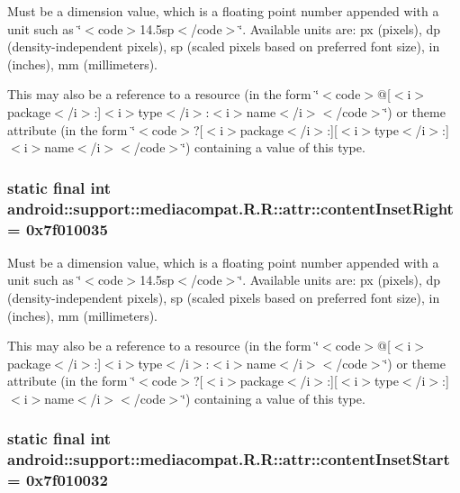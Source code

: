 Must be a dimension value, which is a floating point number appended with a unit such as \char`\"{}$<$code$>$14.5sp$<$/code$>$\char`\"{}. Available units are: px (pixels), dp (density-independent pixels), sp (scaled pixels based on preferred font size), in (inches), mm (millimeters). 

This may also be a reference to a resource (in the form \char`\"{}$<$code$>$@\mbox{[}$<$i$>$package$<$/i$>$:\mbox{]}$<$i$>$type$<$/i$>$:$<$i$>$name$<$/i$>$$<$/code$>$\char`\"{}) or theme attribute (in the form \char`\"{}$<$code$>$?\mbox{[}$<$i$>$package$<$/i$>$:\mbox{]}\mbox{[}$<$i$>$type$<$/i$>$:\mbox{]}$<$i$>$name$<$/i$>$$<$/code$>$\char`\"{}) containing a value of this type. \hypertarget{classandroid_1_1support_1_1mediacompat_1_1_r_1_1attr_49d694e00d85ec9dde403911ea1bad7b}{
\subsubsection[{contentInsetRight}]{\setlength{\rightskip}{0pt plus 5cm}static final int android::support::mediacompat.R.R::attr::contentInsetRight = 0x7f010035}}
\label{classandroid_1_1support_1_1mediacompat_1_1_r_1_1attr_49d694e00d85ec9dde403911ea1bad7b}


Must be a dimension value, which is a floating point number appended with a unit such as \char`\"{}$<$code$>$14.5sp$<$/code$>$\char`\"{}. Available units are: px (pixels), dp (density-independent pixels), sp (scaled pixels based on preferred font size), in (inches), mm (millimeters). 

This may also be a reference to a resource (in the form \char`\"{}$<$code$>$@\mbox{[}$<$i$>$package$<$/i$>$:\mbox{]}$<$i$>$type$<$/i$>$:$<$i$>$name$<$/i$>$$<$/code$>$\char`\"{}) or theme attribute (in the form \char`\"{}$<$code$>$?\mbox{[}$<$i$>$package$<$/i$>$:\mbox{]}\mbox{[}$<$i$>$type$<$/i$>$:\mbox{]}$<$i$>$name$<$/i$>$$<$/code$>$\char`\"{}) containing a value of this type. \hypertarget{classandroid_1_1support_1_1mediacompat_1_1_r_1_1attr_14132900f47d0619ec8c616445eafbe5}{
\subsubsection[{contentInsetStart}]{\setlength{\rightskip}{0pt plus 5cm}static final int android::support::mediacompat.R.R::attr::contentInsetStart = 0x7f010032}}
\label{classandroid_1_1support_1_1mediacompat_1_1_r_1_1attr_14132900f47d0619ec8c616445eafbe5}


